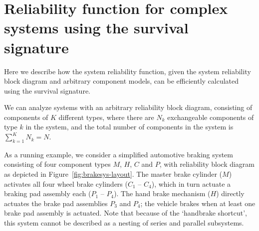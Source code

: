 \documentclass[authoryear]{elsarticle}
\def\tnow{t_\text{now}}
\newcommand{\Rsysnow}{R^{(t_\text{now})}_\text{sys}}
\begin{document}
\section{Reliability function for complex systems using the survival signature}
\label{sec:sysrel}

Here we describe how the system reliability function, given the system reliability block diagram and arbitrary component models,
can be efficiently calculated using the survival signature.

We can analyze systems with an arbitrary reliability block diagram,
consisting of components of $K$ different types,
where there are $N_k$ exchangeable components of type $k$ in the system,
and the total number of components in the system is $\sum_{k=1}^K N_k = N$.

As a running example, we consider a simplified automotive braking system
consisting of four component types $M$, $H$, $C$ and $P$,
with reliability block diagram as depicted in Figure~\ref{fig:brakesys-layout}.
The master brake cylinder ($M$) activates all four wheel brake cylinders ($C_1$ -- $C_4$),
which in turn actuate a braking pad assembly each ($P_1$ -- $P_4$).
The hand brake mechanism ($H$) directly actuates the brake pad assemblies $P_3$ and $P_4$;
the vehicle brakes when at least one brake pad assembly is actuated.
Note that because of the `handbrake shortcut', this system cannot be described as a nesting of series and parallel subsystems.
\end{document}
